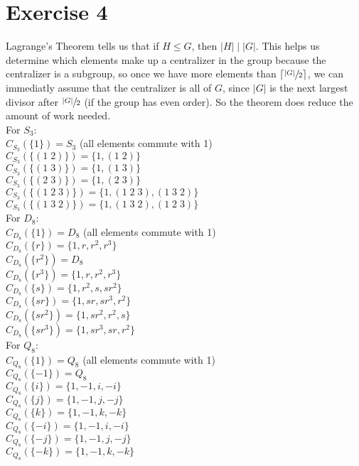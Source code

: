 \documentclass[12pt]{article}
\begin{document}
    \section*{Exercise 4}
    Lagrange's Theorem tells us that if $H \leqslant G$,
    then $|H| \mid |G|$.
    This helps us determine which elements make up a centralizer in
    the group because the centralizer is a subgroup,
    so once we have more elements than $\lceil \sfrac{|G|}{2} \rceil$,
    we can immediatly assume that the centralizer is all of $G$,
    since $|G|$ is the next largest divisor after $\sfrac{|G|}{2}$ 
    (if the group has even order).
    So the theorem does reduce the amount of work needed. \\
    For $S_3$: \\
    $C_{S_3}(\{ 1 \}) = S_3$ (all elements commute with 1) \\
    $C_{S_3}(\{(1\;2)\}) = \{1, (1\;2)\}$ \\
    $C_{S_3}(\{(1\;3)\}) = \{1, (1\;3)\}$ \\
    $C_{S_3}(\{(2\;3)\}) = \{1, (2\;3)\}$ \\
    $C_{S_3}(\{(1\;2\;3)\}) = \{1, (1\;2\;3), (1\;3\;2)\}$ \\
    $C_{S_3}(\{(1\;3\;2)\}) = \{1, (1\;3\;2), (1\;2\;3)\}$ \\
    For $D_8$: \\
    $C_{D_8}(\{ 1 \}) = D_8$ (all elements commute with 1) \\
    $C_{D_8}(\{ r \}) = \{1, r, r^2, r^3\}$ \\
    $C_{D_8}(\{ r^2 \}) = D_8$ \\
    $C_{D_8}(\{ r^3 \}) = \{1, r, r^2, r^3\}$ \\
    $C_{D_8}(\{ s \}) = \{1, r^2, s, sr^2\}$ \\
    $C_{D_8}(\{ sr \}) = \{1, sr, sr^3, r^2\}$ \\
    $C_{D_8}(\{ sr^2 \}) = \{1, sr^2, r^2, s\}$ \\
    $C_{D_8}(\{ sr^3 \}) = \{1, sr^3, sr, r^2\}$ \\
    For $Q_8$: \\
    $C_{Q_8}(\{ 1 \}) = Q_8$ (all elements commute with 1) \\
    $C_{Q_8}(\{ -1 \}) = Q_8$ \\
    $C_{Q_8}(\{ i \}) = \{ 1, -1, i, -i \}$ \\
    $C_{Q_8}(\{ j \}) = \{ 1, -1, j, -j \}$ \\
    $C_{Q_8}(\{ k \}) = \{ 1, -1, k, -k \}$ \\
    $C_{Q_8}(\{ -i \}) = \{ 1, -1, i, -i \}$ \\
    $C_{Q_8}(\{ -j \}) = \{ 1, -1, j, -j \}$ \\
    $C_{Q_8}(\{ -k \}) = \{ 1, -1, k, -k \}$
\end{document}
